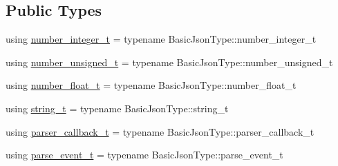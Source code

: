 \subsection*{Public Types}
\begin{DoxyCompactItemize}
\item 
using \hyperlink{classnlohmann_1_1detail_1_1json__sax__dom__callback__parser_a3ba8fc7a8d83c5b0eeb3b543ad844b8d}{number\+\_\+integer\+\_\+t} = typename Basic\+Json\+Type\+::number\+\_\+integer\+\_\+t
\item 
using \hyperlink{classnlohmann_1_1detail_1_1json__sax__dom__callback__parser_a2406c5125f7128fb9c01921df2903001}{number\+\_\+unsigned\+\_\+t} = typename Basic\+Json\+Type\+::number\+\_\+unsigned\+\_\+t
\item 
using \hyperlink{classnlohmann_1_1detail_1_1json__sax__dom__callback__parser_a914ea0555cea5290449fb791ae41c655}{number\+\_\+float\+\_\+t} = typename Basic\+Json\+Type\+::number\+\_\+float\+\_\+t
\item 
using \hyperlink{classnlohmann_1_1detail_1_1json__sax__dom__callback__parser_a00e7d95d82d5d8a43421526a42a8eabc}{string\+\_\+t} = typename Basic\+Json\+Type\+::string\+\_\+t
\item 
using \hyperlink{classnlohmann_1_1detail_1_1json__sax__dom__callback__parser_a4f636086fa8e7cf26c35c8afd50903ce}{parser\+\_\+callback\+\_\+t} = typename Basic\+Json\+Type\+::parser\+\_\+callback\+\_\+t
\item 
using \hyperlink{classnlohmann_1_1detail_1_1json__sax__dom__callback__parser_aac6d706967b2ecc2510e172577d8550b}{parse\+\_\+event\+\_\+t} = typename Basic\+Json\+Type\+::parse\+\_\+event\+\_\+t
\end{DoxyCompactItemize}
